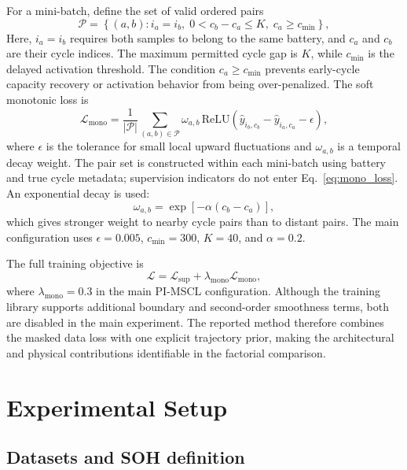 \documentclass[pdflatex,sn-mathphys-num]{sn-jnl}
\begin{document}
For a mini-batch, define the set of valid ordered pairs
\begin{equation}
\mathcal{P}=\left\{(a,b): i_a=i_b,\;0<c_b-c_a\leq K,\;c_a\geq c_{\min}\right\},
\label{eq:pair_set}
\end{equation}
Here, $i_a=i_b$ requires both samples to belong to the same battery, and $c_a$ and $c_b$ are their cycle indices. The maximum permitted cycle gap is $K$, while $c_{\min}$ is the delayed activation threshold. The condition $c_a\geq c_{\min}$ prevents early-cycle capacity recovery or activation behavior from being over-penalized. The soft monotonic loss is
\begin{equation}
\mathcal{L}_{\mathrm{mono}}=
\frac{1}{|\mathcal{P}|}
\sum_{(a,b)\in\mathcal{P}}
\omega_{a,b}\,
\mathrm{ReLU}\left(\hat{y}_{i_b,c_b}-\hat{y}_{i_a,c_a}-\epsilon\right),
\label{eq:mono_loss}
\end{equation}
where $\epsilon$ is the tolerance for small local upward fluctuations and $\omega_{a,b}$ is a temporal decay weight. The pair set is constructed within each mini-batch using battery and true cycle metadata; supervision indicators do not enter Eq.~\eqref{eq:mono_loss}. An exponential decay is used:
\begin{equation}
\omega_{a,b}=\exp\left[-\alpha\left(c_b-c_a\right)\right],
\label{eq:temporal_decay}
\end{equation}
which gives stronger weight to nearby cycle pairs than to distant pairs. The main configuration uses $\epsilon=0.005$, $c_{\min}=300$, $K=40$, and $\alpha=0.2$.

The full training objective is
\begin{equation}
\mathcal{L}=\mathcal{L}_{\mathrm{sup}}
+\lambda_{\mathrm{mono}}\mathcal{L}_{\mathrm{mono}},
\label{eq:total_loss}
\end{equation}
where $\lambda_{\mathrm{mono}}=0.3$ in the main PI-MSCL configuration. Although the training library supports additional boundary and second-order smoothness terms, both are disabled in the main experiment. The reported method therefore combines the masked data loss with one explicit trajectory prior, making the architectural and physical contributions identifiable in the factorial comparison.
\section{Experimental Setup}
\label{sec:experiments}

\subsection{Datasets and SOH definition}
\label{subsec:datasets}
\end{document}
